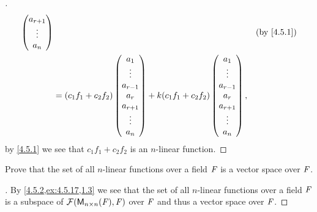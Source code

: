 \begin{proof}[]
\begin{align*}
\begin{pmatrix}
			                                           a_{r + 1} \\
			                                           \vdots    \\
			                                           a_n
		                                           \end{pmatrix}             &  & \by{4.5.1} \\
		 & = (c_1 f_1 + c_2 f_2)\begin{pmatrix}
			                        a_1       \\
			                        \vdots    \\
			                        a_{r - 1} \\
			                        a_r       \\
			                        a_{r + 1} \\
			                        \vdots    \\
			                        a_n
		                        \end{pmatrix} + k (c_1 f_1 + c_2 f_2)\begin{pmatrix}
			                                                             a_1       \\
			                                                             \vdots    \\
			                                                             a_{r - 1} \\
			                                                             a_r       \\
			                                                             a_{r + 1} \\
			                                                             \vdots    \\
			                                                             a_n
		                                                             \end{pmatrix},
	\end{align*}
	by \cref{4.5.1} we see that \(c_1 f_1 + c_2 f_2\) is an \(n\)-linear function.
\end{proof}

\begin{ex}\label{ex:4.5.18}
	Prove that the set of all \(n\)-linear functions over a field \(\mathit{F}\) is a vector space over \(\mathit{F}\).
\end{ex}

\begin{proof}[]
	By \cref{4.5.2,ex:4.5.17,1.3} we see that the set of all \(n\)-linear functions over a field \(\mathit{F}\) is a subspace of \(\mathcal{F}(\mathsf{M}_{{n} \times n}({\mathit{F}}), \mathit{F})\) over \(\mathit{F}\) and thus a vector space over \(\mathit{F}\).
\end{proof}

